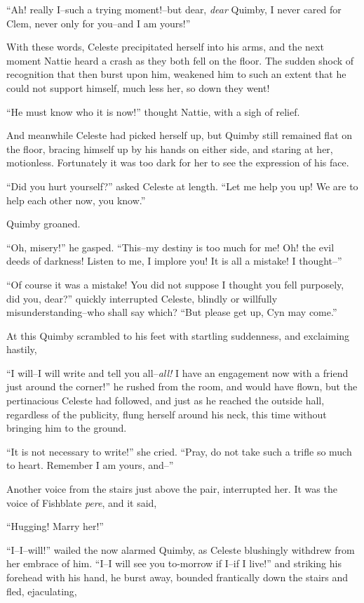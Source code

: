 ``Ah! really I--such a trying moment!--but dear, \emph{dear} Quimby, I never
cared for Clem, never only for you--and I am yours!''

With these words, Celeste precipitated herself into his arms, and the
next moment Nattie heard a crash as they both fell on the floor. The
sudden shock of recognition that then burst upon him, weakened him to
such an extent that he could not support himself, much less her, so down
they went!

``He must know who it is now!'' thought Nattie, with a sigh of relief.

And meanwhile Celeste had picked herself up, but Quimby still remained
flat on the floor, bracing himself up by his hands on either side, and
staring at her, motionless. Fortunately it was too dark for her to see
the expression of his face.

``Did you hurt yourself?'' asked Celeste at length. ``Let me help you up!
We are to help each other now, you know.''

Quimby groaned.

``Oh, misery!'' he gasped. ``This--my destiny is too much for me! Oh! the
evil deeds of darkness! Listen to me, I implore you! It is all a
mistake! I thought--''

``Of course it was a mistake! You did not suppose I thought you fell
purposely, did you, dear?'' quickly interrupted Celeste, blindly or
willfully misunderstanding--who shall say which? ``But please get up, Cyn
may come.''

At this Quimby scrambled to his feet with startling suddenness, and
exclaiming hastily,

``I will--I will write and tell you all--\emph{all!} I have an engagement now
with a friend just around the corner!'' he rushed from the room, and
would have flown, but the pertinacious Celeste had followed, and just as
he reached the outside hall, regardless of the publicity, flung herself
around his neck, this time without bringing him to the ground.

``It is not necessary to write!'' she cried. ``Pray, do not take such a
trifle so much to heart. Remember I am yours, and--''

Another voice from the stairs just above the pair, interrupted her. It
was the voice of Fishblate \emph{pere}, and it said,

``Hugging! Marry her!''

``I--I--will!'' wailed the now alarmed Quimby, as Celeste blushingly
withdrew from her embrace of him. ``I--I will see you to-morrow if I--if
I live!'' and striking his forehead with his hand, he burst away, bounded
frantically down the stairs and fled, ejaculating,

